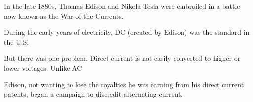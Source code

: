 \documentclass[preview]{standalone}
\begin{document}
\centering \item In the late 1880s, Thomas Edison and Nikola Tesla were embroiled in a battle now known as the War of the Currents. \item During the early years of electricity, DC (created by Edison) was the standard in the U.S. \item But there was one problem. Direct current is not easily converted to higher or lower voltages. Unlike AC \item Edison, not wanting to lose the royalties he was earning from his direct current patents, began a campaign to discredit alternating current.
\end{document}
